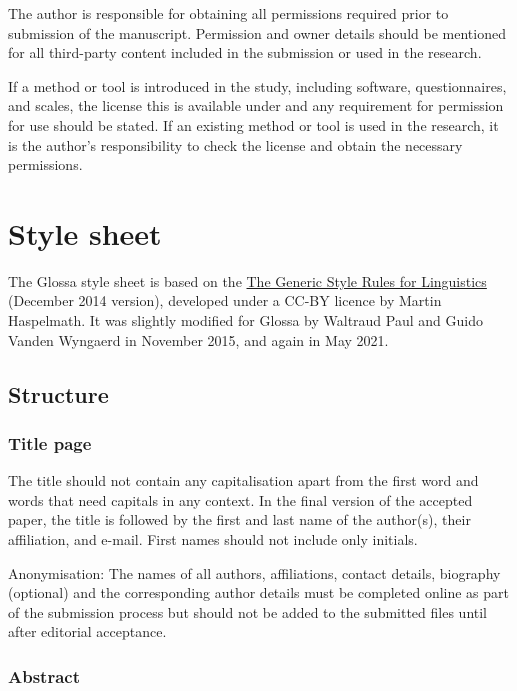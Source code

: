 \documentclass[charis,linguex,biblatex]{glossa}
\begin{document}
The author is responsible for obtaining all permissions required prior to submission of the manuscript. Permission and owner details should be mentioned for all third-party content included in the submission or used in the research.

If a method or tool is introduced in the study, including software, questionnaires, and scales, the license this is available under and any requirement for permission for use should be stated. If an existing method or tool is used in the research, it is the author's responsibility to check the license and obtain the necessary permissions. %


\section{Style sheet}\label{ss}

The Glossa style sheet is based on the \href{http://www.eva.mpg.de/linguistics/past-research-resources/resources/generic-style-rules.html}{The Generic Style Rules for Linguistics} (December 2014 version), developed under a CC-BY licence by Martin Haspelmath. It was slightly modified for Glossa by Waltraud Paul and Guido Vanden Wyngaerd in November 2015, and again in May 2021. 

\subsection{Structure}

\subsubsection{Title page}

The title should not contain any capitalisation apart from the first word and words that need capitals in any context. In the final version of the accepted paper, the title is followed by the first and last name of the author(s), their affiliation, and e-mail. First names should not include only initials.  

Anonymisation: The names of all authors, affiliations, contact details, biography (optional) and the corresponding author details must be completed online as part of the submission process but should not be added to the submitted files until after editorial acceptance.

\subsubsection{Abstract}
\end{document}
